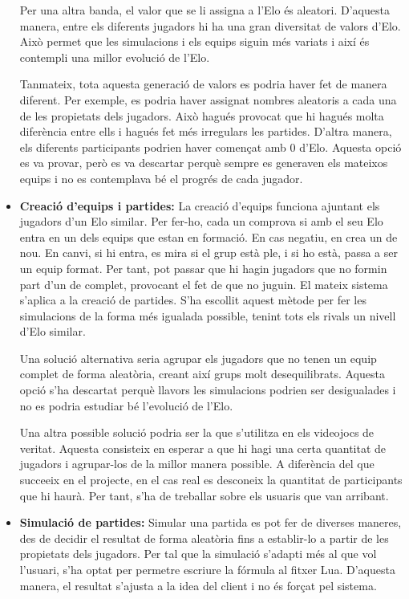 \documentclass[a4paper]{article}
\begin{document}
\begin{itemize}
    Per una altra banda, el valor que se li assigna a l'Elo és aleatori. D'aquesta manera, entre els diferents jugadors hi ha una gran diversitat de valors d'Elo. Això permet que les simulacions i els equips siguin més variats i així és contempli una millor evolució de l'Elo.
    
    Tanmateix, tota aquesta generació de valors es podria haver fet de manera diferent. Per exemple, es podria haver assignat nombres aleatoris a cada una de les propietats dels jugadors. Això hagués provocat que hi hagués molta diferència entre ells i hagués fet més irregulars les partides. D'altra manera, els diferents participants podrien haver començat amb 0 d'Elo. Aquesta opció es va provar, però es va descartar perquè sempre es generaven els mateixos equips i no es contemplava bé el progrés de cada jugador.
    
    \item \textbf{Creació d'equips i partides:} La creació d'equips funciona ajuntant els jugadors d'un Elo similar. Per fer-ho, cada un comprova si amb el seu Elo entra en un dels equips que estan en formació. En cas negatiu, en crea un de nou. En canvi, si hi entra, es mira si el grup està ple, i si ho està, passa a ser un equip format. Per tant, pot passar que hi hagin jugadors que no formin part d'un de complet, provocant el fet de que no juguin. El mateix sistema s'aplica a la creació de partides. S'ha escollit aquest mètode per fer les simulacions de la forma més igualada possible, tenint tots els rivals un nivell d'Elo similar. 
    
    Una solució alternativa seria agrupar els jugadors que no tenen un equip complet de forma aleatòria, creant així grups molt desequilibrats. Aquesta opció s'ha descartat perquè llavors les simulacions podrien ser desigualades i no es podria estudiar bé l'evolució de l'Elo. 
    
    Una altra possible solució podria ser la que s'utilitza en els videojocs de veritat. Aquesta consisteix en esperar a que hi hagi una certa quantitat de jugadors i agrupar-los de la millor manera possible. A diferència del que succeeix en el projecte, en el cas real es desconeix la quantitat de participants que hi haurà. Per tant, s'ha de treballar sobre els usuaris que van arribant.   
    
    \item \textbf{Simulació de partides:} Simular una partida es pot fer de diverses maneres, des de decidir el resultat de forma aleatòria fins a establir-lo a partir de les propietats dels jugadors. Per tal que la simulació s'adapti més al que vol l'usuari, s'ha optat per permetre escriure la fórmula al fitxer Lua. D'aquesta manera, el resultat s'ajusta a la idea del client i no és forçat pel sistema.
    

\end{itemize}
\end{document}
